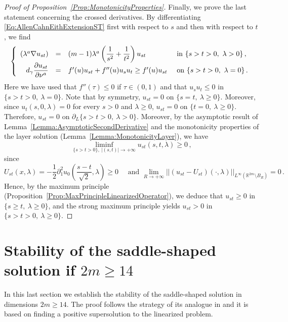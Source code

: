 \documentclass[12pt,reqno]{amsart}
\theoremstyle{definition}
\theoremstyle{remark}
\newcommand{\con}[1]{\mathbb{#1}}
\newcommand{\R}{\con{R}} %
\newcommand{\norm}[1]{\left | \left |{#1} \right | \right |}
\newcommand{\s}{\gamma}
\newcommand{\bpar}[1]{\left ( {#1}\right )}
\newcommand\beqc[1]{\left\{\begin{array}{#1}}
\newcommand\eeqc{\end{array} \right.}
\def\PDEsystem{rcll}
\let\div\relax
\DeclareMathOperator{\div}{div}
\numberwithin{equation}{section}
\begin{document}
\begin{proof}[Proof of Proposition~\ref{Prop:MonotonicityProperties}]
Finally, we prove the last statement concerning the crossed derivatives. By differentiating \eqref{Eq:AllenCahnEithExtensionST} first with respect to $s$ and then with respect to $t$, we find
$$
\beqc{\PDEsystem}
\div (\lambda^a \nabla u_{st}) & = & (m-1)\lambda^a \bpar{\dfrac{1}{s^2} + \dfrac{1}{t^2} } u_{st} & \text{ in } \{ s > t > 0 ,\ \lambda > 0\}\,, \\
d_\s \dfrac{\partial u_{st}}{\partial \nu^a}& = & f'(u)u_{st} + f''(u)u_s u_t \geq  f'(u)u_{st}& \text{ on }  \{ s > t > 0 , \ \lambda = 0\}\,.
\eeqc
$$
Here we have used that $f''(\tau) \leq 0$ if $\tau \in (0,1)$ and that $u_s u_t \leq 0$ in  $\{ s > t > 0 , \ \lambda = 0\}$.
Note that by symmetry, $u_{st}= 0$ on $\{s=t, \ \lambda \geq 0 \}$. Moreover, since $u_t(s,0,\lambda) = 0$ for every $s > 0$ and $\lambda \geq 0$, $u_{st}= 0$ on $\{t=0, \ \lambda \geq 0 \}$. Therefore, $u_{st}= 0$ on $\partial_L \{ s > t > 0 ,\ \lambda > 0\}$. Moreover, by the asymptotic result of Lemma~\ref{Lemma:AsymptoticSecondDerivative} and the monotonicity properties of the layer solution (Lemma~\ref{Lemma:MonotonicityLayer}), we have
$$
\liminf_{\{s> t>0\} ,\ |(s,t)|\to +\infty}  u_{st}(s,t,\lambda) \geq 0\,,
$$
since
$$
U_{st} (x,\lambda) = -\dfrac{1}{2} \partial_1^2 u_0\bpar{\dfrac{s-t}{\sqrt{2}}, \lambda} \geq 0 \quad \text{ and } \lim_{R\to +\infty} \norm{(u_{st} - U_{st})(\cdot,\lambda) }_{L^\infty(\R^{2m}\setminus B_{R})} = 0\,.
$$
Hence, by the maximum principle (Proposition~\ref{Prop:MaxPrincipleLinearizedOperator}), we deduce that $u_{st} \geq 0$ in $\{ s \geq t,\ \lambda \geq 0\}$, and the strong maximum principle yields $u_{st} > 0$ in $\{ s > t > 0,\ \lambda \geq 0\}$.
\end{proof}


\section{Stability of the saddle-shaped solution if $2m\geq 14$}
\label{Sec:Stability}

In this last section we establish the stability of the saddle-shaped solution in dimensions $2m\geq 14$. The proof follows the strategy of its analogue in \cite{Cabre-Saddle} and it is based on finding a positive supersolution to the linearized problem.
\end{document}
